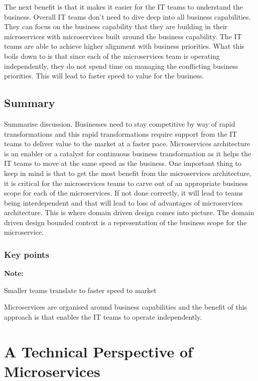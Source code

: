 \documentclass[a4paper, 11pt]{book}
\newenvironment{note}{
    \begin{siderule}
        \textbf{Note: }
        }{
    \end{siderule}
}
\begin{document}
    The next benefit is that it makes it easier for the IT teams to understand the business.
    Overall IT teams don't need to dive deep into all business capabilities.
    They can focus on the business capability that they are building in their microservices with microservices built around the business capability.
    The IT teams are able to achieve higher alignment with business priorities.
    What this boils down to is that since each of the microservices team is operating independently, they do not spend time on managing the conflicting business priorities.
    This will lead to faster speed to value for the business.

    \subsection{Summary}
    Summarise discussion.
    Businesses need to stay competitive by way of rapid transformations and this rapid transformations require support from the IT teams to deliver value to the market at a faster pace.
    Microservices architecture is an enabler or a catalyst for continuous business transformation as it helps the IT teams to move at the same speed as the business.
    One important thing to keep in mind is that to get the most benefit from the microservices architecture,
    it is critical for the microservices teams to carve out of an appropriate business scope for each of the microservices.
    If not done correctly, it will lead to teams being interdependent and that will lead to loss of advantages of microservices architecture.
    This is where domain driven design comes into picture.
    The domain driven design bounded context is a representation of the business scope for the microservice.

    \subsubsection{Key points}
    \begin{note}
    \item Smaller teams translate to faster speed to market
    \item Microservices are organised around business capabilities and the benefit of this approach is that enables the IT teams to operate independently.
    \end{note}


    \section{A Technical Perspective of Microservices}
\end{document}
